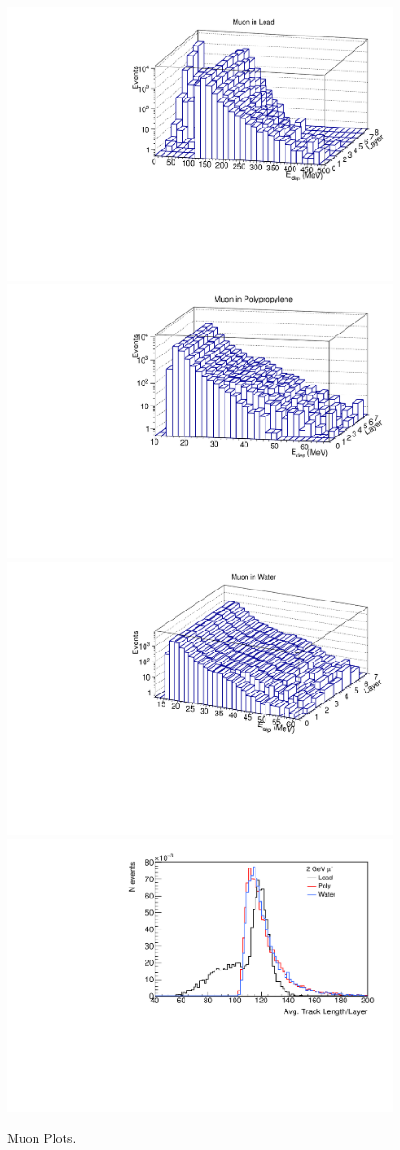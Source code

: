 \documentclass[aps,prd,twocolumn,nofootinbib]{revtex4-1}
\begin{document}
\begin{figure}
  \includegraphics[width=.45\textwidth]{plots/muon_pb_edep.pdf}
  \includegraphics[width=.45\textwidth]{plots/muon_pp_edep.pdf}
  \includegraphics[width=.45\textwidth]{plots/muon_h2o_edep.pdf}
  \includegraphics[width=.45\textwidth]{plots/TL_muon.pdf}
  \caption{Muon Plots.}
  \label{fig:mu-quant}
\end{figure}
\end{document}
